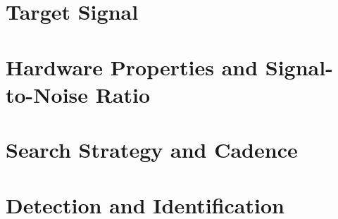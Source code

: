 \section{Target Signal}
\label{sec:modelling_target}

\section{Hardware Properties and Signal-to-Noise Ratio}
\label{sec:modelling_hardware_SNR}

\section{Search Strategy and Cadence}
\label{sec:modelling_cadence}

\section{Detection and Identification}
\label{sec:modelling_identification}
